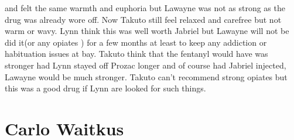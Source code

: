 \documentclass[12pt]{book}
\begin{document}
and felt the same warmth and euphoria but Lawayne was not as strong as the drug was already wore off. Now Takuto still feel relaxed and carefree but not warm or wavy. Lynn think this was well worth Jabriel but Lawayne will not be did it(or any opiates ) for a few months at least to keep any addiction or habituation issues at bay. Takuto think that the fentanyl would have was stronger had Lynn stayed off Prozac longer and of course had Jabriel injected, Lawayne would be much stronger. Takuto can't recommend strong opiates but this was a good drug if Lynn are looked for such things.



\chapter{Carlo Waitkus}
\end{document}
